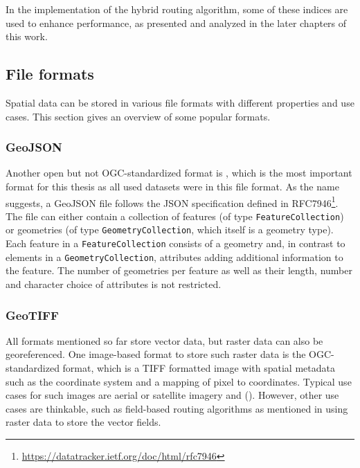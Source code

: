 			In the implementation of the hybrid routing algorithm, some of these indices are used to enhance performance, as presented and analyzed in the later chapters of this work.
			
	\subsection{File formats}
	\label{subsec:file-formats}
	
		Spatial data can be stored in various file formats with different properties and use cases.
		This section gives an overview of some popular formats.
		
		\subsubsection{GeoJSON}
		\label{subsubsec:geojson}
		
			Another open but not OGC-standardized format is , which is the most important format for this thesis as all used datasets were in this file format.
			As the name suggests, a GeoJSON file follows the JSON specification defined in RFC7946\footnote{\url{https://datatracker.ietf.org/doc/html/rfc7946}}.
			The file can either contain a collection of features (of type \texttt{FeatureCollection}) or geometries (of type \texttt{GeometryCollection}, which itself is a geometry type).
			Each feature in a \texttt{FeatureCollection} consists of a geometry and, in contrast to elements in a \texttt{GeometryCollection}, attributes adding additional information to the feature.
			The number of geometries per feature as well as their length, number and character choice of attributes is not restricted.
			
		\subsubsection{GeoTIFF}
		\label{subsubsec:geotiff-format}
		
			All formats mentioned so far store vector data, but raster data can also be georeferenced.
			One image-based format to store such raster data is the OGC-standardized  format\cite{ogc-geotiff}, which is a TIFF formatted image with spatial metadata such as the coordinate system and a mapping of pixel to coordinates.
			Typical use cases for such images are aerial or satellite imagery and  ().
			However, other use cases are thinkable, such as field-based routing algorithms as mentioned in  using raster data to store the vector fields.
		
